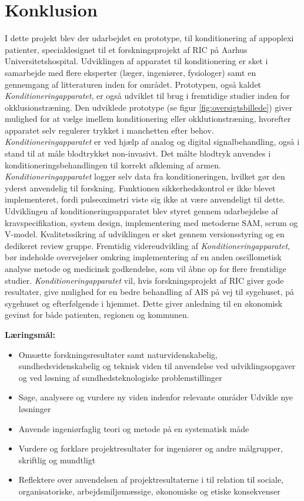 \chapter{Konklusion}
I dette projekt blev der udarbejdet en prototype, til konditionering af appoplexi patienter, specialdesignet til et forskningsprojekt af RIC på Aarhus Universitetshospital. Udviklingen af apparatet til konditionering er sket i samarbejde med flere eksperter (læger, ingeniører, fysiologer) samt en gennemgang af litteraturen inden for området. Prototypen, også kaldet \textit{Konditioneringapparatet}, er også udviklet til brug i fremtidige studier inden for okklusionstræning.
Den udviklede prototype (se figur \ref{fig:oversigtsbillede}) giver mulighed for at vælge imellem konditionering eller okklutionstræning, hvorefter apparatet selv regulerer trykket i manchetten efter behov. \textit{Konditioneringapparatet} er ved hjælp af analog og digital signalbehandling, også i stand til at måle blodtrykket non-invasivt. Det målte blodtryk anvendes i konditioneringsbehandlingen til korrekt afkleming af armen. \textit{Konditioneringapparatet} logger selv data fra konditioneringen, hvilket gør den yderst anvendelig til forskning. Funktionen sikkerhedskontrol er ikke blevet implementeret, fordi pulseoximetri viste sig ikke at være anvendeligt til dette.
Udviklingen af konditioneringsapparatet blev styret gennem udarbejdelse af kravspecifikation, system design, implementering med metoderne SAM, scrum og V-model. Kvalitetssikring af udviklingen er sket gennem versionsstyring og en dedikeret review gruppe.
Fremtidig videreudvikling af \textit{Konditioneringapparatet}, bør indeholde overvejelser omkring implementering af en anden oscillometisk analyse metode og medicinsk godkendelse, som vil åbne op for flere fremtidige studier.
\textit{Konditioneringapparatet} vil, hvis forskningsprojekt af RIC giver gode resultater, give mulighed for en bedre behandling af AIS på vej til sygehuset, på sygehuset og efterfølgende i hjemmet. Dette giver anledning til en økonomisk gevinst for både patienten, regionen og kommunen. 

\label{SidsteSide}

\textbf{Læringsmål:}
\begin{itemize}
	\item Omsætte forskningsresultater samt naturvidenskabelig, sundhedsvidenskabelig og teknisk viden til anvendelse ved udviklingsopgaver og ved løsning af sundhedsteknologiske problemstillinger
	\item Søge, analysere og vurdere ny viden indenfor relevante områder
	Udvikle nye løsninger
	\item Anvende ingeniørfaglig teori og metode på en systematisk måde
	\item Vurdere og forklare projektresultater for ingeniører og andre målgrupper, skriftlig og mundtligt
	
	\item Reflektere over anvendelsen af projektresultaterne i til relation til sociale, organisatoriske, arbejdsmiljømæssige, økonomiske og etiske konsekvenser
	
\end{itemize}




